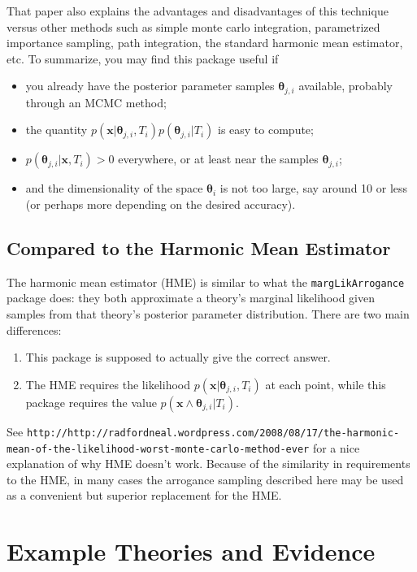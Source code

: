 \documentclass[letterpaper,12pt]{article}
\newcommand{\bx}{\boldsymbol x}
\newcommand{\btheta}{\boldsymbol \theta}%
\begin{document}
That paper also explains the advantages and disadvantages of this
technique versus other methods such as simple monte carlo integration,
parametrized importance sampling, path integration, the standard
harmonic mean estimator, etc.  To summarize, you may find this package
useful if

\begin{itemize}
  \item you already have the posterior parameter samples
    $\btheta_{j,i}$ available, probably through an MCMC method;
  \item the quantity $p(\bx | \btheta_{j,i}, T_i)p(\btheta_{j,i}|T_i)$
    is easy to compute;
  \item $p(\btheta_{j,i}|\bx, T_i) > 0$ everywhere, or at least near
    the samples $\btheta_{j,i}$;
  \item and the dimensionality of the space $\btheta_i$ is not too
    large, say around 10 or less (or perhaps more depending on the
    desired accuracy).
\end{itemize}

\subsection{Compared to the Harmonic Mean Estimator}

The harmonic mean estimator (HME) is similar to what the
\texttt{margLikArrogance} package does: they both approximate a
theory's marginal likelihood given samples from that theory's
posterior parameter distribution.  There are two main differences:

\begin{enumerate}
  \item This package is supposed to actually give the correct answer.
    \item The HME requires the likelihood $p(\bx | \btheta_{j,i},
      T_i)$ at each point, while this package requires the value
      $p(\bx \wedge \btheta_{j,i} | T_i)$.
\end{enumerate}

\noindent
See
\texttt{http://http://radfordneal.wordpress.com/2008/08/17/the-harmonic-mean-of-the-likelihood-worst-monte-carlo-method-ever}
for a nice explanation of why HME doesn't work.  Because of the
similarity in requirements to the HME, in many cases the arrogance
sampling described here may be used as a convenient but superior
replacement for the HME.


\section{Example Theories and Evidence}
\end{document}
